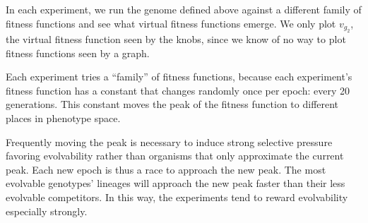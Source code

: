 \documentclass[letterpaper]{article}
\begin{document}
In each experiment, we run the genome defined above against a different family
of fitness functions and see what virtual fitness functions emerge. We only
plot $v_{g_2}$, the virtual fitness function seen by the knobs, since we know
of no way to plot fitness functions seen by a graph.

Each experiment tries a ``family'' of fitness functions, because each
experiment's fitness function has a constant that changes randomly once per
epoch: every 20 generations. This constant moves the peak of the fitness
function to different places in phenotype space.

Frequently moving the peak is necessary to induce strong selective pressure
favoring evolvability rather than organisms that only approximate the current
peak.
Each new epoch is thus a race to approach the new peak. The most
evolvable genotypes' lineages will approach the new peak faster than their
less evolvable competitors. In this way, the experiments tend to reward
evolvability especially strongly.
\end{document}
